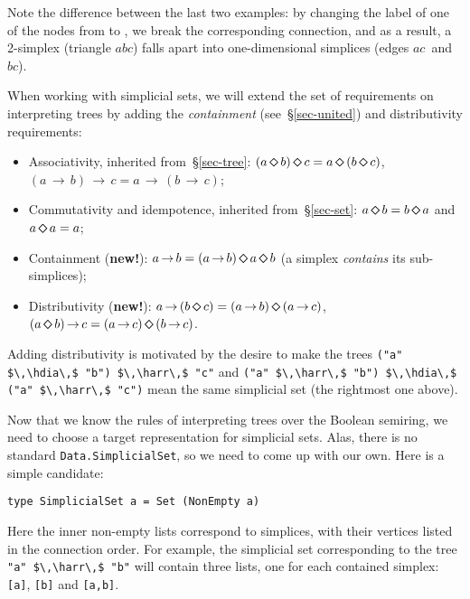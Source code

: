 \documentclass[english,submission]{programming}
\newcommand{\code}[1]{\lstinline[mathescape]|#1|}
\newcommand{\hdia}{\,\text{\raisebox{-0.2mm}{\Large\color{darkblue} $\diamond$}}\,}
\newcommand{\harr}{\,\text{\color{darkblue} $\rightarrow$}\,}
\newcommand{\zero}{\raisebox{-0.2mm}{\textcircled{0}}\xspace}
\newcommand{\one}{\raisebox{-0.2mm}{\textcircled{1}}\xspace}
\newcommand{\dia}{\,\text{\raisebox{-0.3mm}{\Large $\diamond$}}\,}
\newcommand{\arr}{\,\text{$\rightarrow$}\,}
\begin{document}
\vspace{5mm}
\hfill\hspace{-4mm}\hfill
\vspace{5mm}

\noindent
Note the difference between the last two examples: by changing the label of one
of the nodes from \one to \zero, we break the corresponding connection,
and as a result, a 2-simplex (triangle $\textit{abc}$) falls apart into
one-dimensional simplices (edges $\textit{ac}$~and~$\textit{bc}$).

When working with simplicial sets, we will extend the set of requirements on
interpreting trees by adding the \emph{containment} (see~\S\ref{sec-united}) and
distributivity requirements:

\begin{itemize}
    \item Associativity, inherited from~\S\ref{sec-tree}:
          $(a \dia b) \dia c = a \dia (b \dia c)$,
          $(a \arr b) \arr c = a \arr (b \arr c)$;
    \item Commutativity and idempotence, inherited from~\S\ref{sec-set}:
          $a \dia b = b \dia a$ and $a \dia a = a$;
    \item Containment (\textbf{\color{darkblue}new!}):
          $a \arr b = (a \arr b) \dia a \dia b$ (a simplex \emph{contains} its sub-simplices);
    \item Distributivity (\textbf{\color{darkblue}new!}):
          $a \arr (b \dia c) = (a \arr b) \dia (a \arr c)$,
          $(a \dia b) \arr c = (a \arr c) \dia (b \arr c)$.
\end{itemize}

\noindent
Adding distributivity is motivated by the desire to make the trees
\code{("a" $\,\hdia\,$ "b") $\,\harr\,$ "c"} and
\code{("a" $\,\harr\,$ "b") $\,\hdia\,$ ("a" $\,\harr\,$ "c")} mean the same
simplicial set (the rightmost one above).

Now that we know the rules of interpreting trees over the Boolean semiring, we
need to choose a target representation for simplicial sets. Alas, there is no
standard \code{Data.SimplicialS}\code{et}, so we need to come up with our own.
Here is a simple candidate:

\begin{lstlisting}
type SimplicialSet a = Set (NonEmpty a)
\end{lstlisting}

\noindent
Here the inner non-empty lists correspond to simplices, with their vertices
listed in the connection order. For example, the simplicial set corresponding to
the tree \code{"a" $\,\harr\,$ "b"} will contain three lists, one for each
contained simplex: \code{[a]}, \code{[b]} and \code{[a,b]}.
\end{document}
